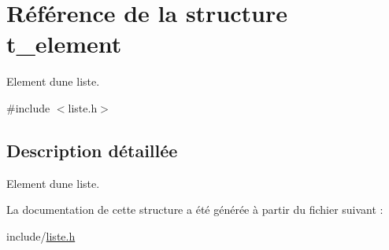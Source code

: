 \hypertarget{structt__element}{}\section{Référence de la structure t\+\_\+element}
\label{structt__element}


Element d\textquotesingle{}une liste.  




{\ttfamily \#include $<$liste.\+h$>$}



\subsection{Description détaillée}
Element d\textquotesingle{}une liste. 

La documentation de cette structure a été générée à partir du fichier suivant \+:\begin{DoxyCompactItemize}
\item 
include/\hyperlink{liste_8h}{liste.\+h}\end{DoxyCompactItemize}
